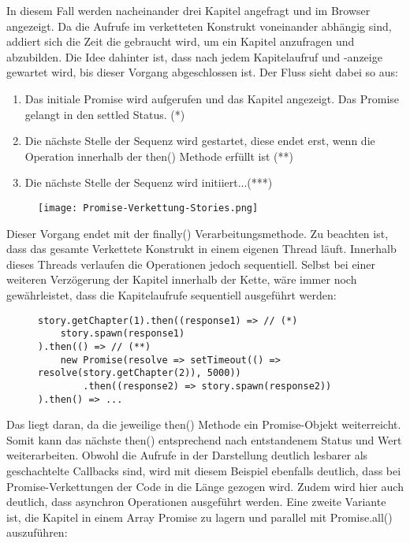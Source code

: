 \noindent
In diesem Fall werden nacheinander drei Kapitel angefragt und im Browser angezeigt. Da die Aufrufe im verketteten Konstrukt voneinander abhängig sind, addiert sich die Zeit die gebraucht wird, um ein Kapitel anzufragen und abzubilden. Die Idee dahinter ist, dass nach jedem Kapitelaufruf und -anzeige gewartet wird, bis dieser Vorgang abgeschlossen ist. Der Fluss sieht dabei so aus:

\begin{enumerate}
    \item Das initiale Promise wird aufgerufen und das Kapitel angezeigt. Das Promise gelangt in den settled Status. (*)
    \item Die nächste Stelle der Sequenz wird gestartet, diese endet erst, wenn die Operation innerhalb der then() Methode erfüllt ist (**)
    \item Die nächste Stelle der Sequenz wird initiiert...(***)
\end{enumerate}

\begin{figure}[H]
\centering
\texttt{[image: Promise-Verkettung-Stories.png]}
\end{figure}

\noindent
Dieser Vorgang endet mit der finally() Verarbeitungsmethode. Zu beachten ist, dass das gesamte Verkettete Konstrukt in einem eigenen Thread läuft. Innerhalb dieses Threads verlaufen die Operationen jedoch sequentiell. Selbst bei einer weiteren Verzögerung der Kapitel innerhalb der Kette, wäre immer noch gewährleistet, dass die Kapitelaufrufe sequentiell ausgeführt werden:

\begin{figure}[H]
\begin{lstlisting}[basicstyle=\small]
story.getChapter(1).then((response1) => // (*)
    story.spawn(response1)
).then(() => // (**)
    new Promise(resolve => setTimeout(() => resolve(story.getChapter(2)), 5000))
        .then((response2) => story.spawn(response2))
).then() => ...
\end{lstlisting}
\end{figure}

\noindent
Das liegt daran, da die jeweilige then() Methode ein Promise-Objekt weiterreicht. Somit kann das nächste then() entsprechend nach entstandenem Status und Wert weiterarbeiten. Obwohl die Aufrufe in der Darstellung deutlich lesbarer als geschachtelte Callbacks sind, wird mit diesem Beispiel ebenfalls deutlich, dass bei Promise-Verkettungen der Code in die Länge gezogen wird. Zudem wird hier auch deutlich, dass asynchron Operationen ausgeführt werden. Eine zweite Variante ist, die Kapitel in einem Array Promise zu lagern und parallel mit Promise.all() auszuführen: 


